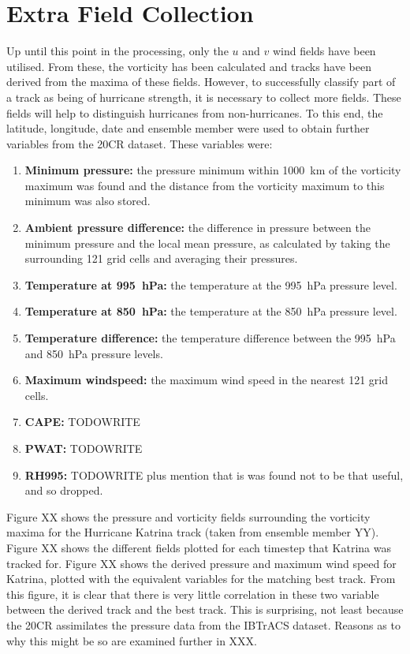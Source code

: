 \documentclass[pdftex,12pt,a4paper]{report}
\begin{document}

\newpage
\section{Extra Field Collection}

Up until this point in the processing, only the $u$ and $v$ wind fields have been utilised. From
these, the vorticity has been calculated and tracks have been derived from the maxima of these
fields.  However, to successfully classify part of a track as being of hurricane strength, it is
necessary to collect more fields. These fields will help to distinguish hurricanes from
non-hurricanes. To this end, the latitude, longitude, date and ensemble member were used to obtain
further variables from the 20CR dataset. These variables were:

\begin{enumerate}
    \item \textbf{Minimum pressure:} the pressure minimum within \SI{1000}{km} of the vorticity
        maximum was found and the distance from the vorticity maximum to this minimum was also stored.
    \item \textbf{Ambient pressure difference:} the difference in pressure between the minimum
        pressure and the local mean pressure, as calculated by taking the surrounding 121 grid cells
        and averaging their pressures.
    \item \textbf{Temperature at \SI{995}{hPa}:} the temperature at the \SI{995}{hPa} pressure
        level.
    \item \textbf{Temperature at \SI{850}{hPa}:} the temperature at the \SI{850}{hPa} pressure
        level.
    \item \textbf{Temperature difference:} the temperature difference between the \SI{995}{hPa} and
        \SI{850}{hPa} pressure levels.
    \item \textbf{Maximum windspeed:} the maximum wind speed in the nearest 121 grid cells.
    \item \textbf{CAPE:} TODOWRITE
    \item \textbf{PWAT:} TODOWRITE
    \item \textbf{RH995:} TODOWRITE plus mention that is was found not to be that useful, and so dropped.
\end{enumerate}

Figure XX shows the pressure and vorticity fields surrounding the vorticity maxima for the Hurricane
Katrina track (taken from ensemble member YY). Figure XX shows the different fields plotted for each
timestep that Katrina was tracked for. Figure XX shows the derived pressure and maximum wind speed
for Katrina, plotted with the equivalent variables for the matching best track. From this figure, it
is clear that there is very little correlation in these two variable between the derived track and
the best track. This is surprising, not least because the 20CR assimilates the pressure data from
the IBTrACS dataset. Reasons as to why this might be so are examined further in XXX.
\end{document}
